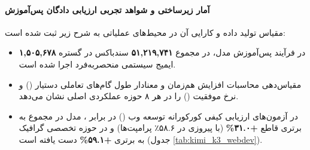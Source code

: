 \paragraph*{آمار زیرساختی و شواهد تجربی ارزیابی دادگان پس‌آموزش}
مقیاس تولید داده و کارایی آن در محیط‌های عملیاتی به شرح زیر ثبت شده است:
\begin{itemize}
    \item در فرآیند پس‌آموزش مدل، در مجموع \textbf{۵۱,۲۱۹,۷۴۱} سندباکس در گستره \textbf{۱,۵۰۵,۶۷۸} ایمیج سیستمی منحصر‌به‌فرد اجرا شده است.
    \item مقیاس‌دهی محاسبات  افزایش هم‌زمان و معنادار طول گام‌های تعاملی دستیار () و نرخ موفقیت () را در هر ۸ حوزه عملکردی اصلی نشان می‌دهد.
    \item در آزمون‌های ارزیابی کیفی کورکورانه توسعه وب () در برابر ، مدل  در مجموع به برتری قاطع \textbf{+۳۱.۰\%} (با پیروزی در ۵۸.۶٪ پرامپت‌ها) و در حوزه تخصصی گرافیک  به برتری \textbf{+۵۹.۱\%} دست یافته است (جدول \ref{tab:kimi_k3_webdev}).
\end{itemize}

\begin{table}[htbp]
\centering
\caption{نتایج داوری کورکورانه کارشناسان در بنچمارک توسعه وب () بر بستر چارچوب }
\label{tab:kimi_k3_webdev}
\end{table}

